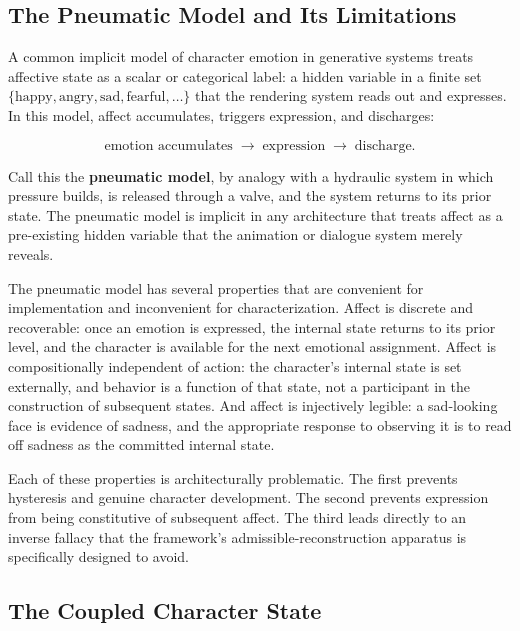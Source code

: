 \documentclass[11pt,a4paper]{article}
\theoremstyle{plain}
\theoremstyle{definition}
\theoremstyle{remark}
\begin{document}
\subsection{The Pneumatic Model and Its Limitations}

A common implicit model of character emotion in generative systems treats affective state as a scalar or categorical label: a hidden variable in a finite set $\{\text{happy}, \text{angry}, \text{sad}, \text{fearful}, \ldots\}$ that the rendering system reads out and expresses. In this model, affect accumulates, triggers expression, and discharges:

\[
\text{emotion accumulates} \;\to\; \text{expression} \;\to\; \text{discharge}.
\]

Call this the \textbf{pneumatic model}, by analogy with a hydraulic system in which pressure builds, is released through a valve, and the system returns to its prior state. The pneumatic model is implicit in any architecture that treats affect as a pre-existing hidden variable that the animation or dialogue system merely reveals.

The pneumatic model has several properties that are convenient for implementation and inconvenient for characterization. Affect is discrete and recoverable: once an emotion is expressed, the internal state returns to its prior level, and the character is available for the next emotional assignment. Affect is compositionally independent of action: the character's internal state is set externally, and behavior is a function of that state, not a participant in the construction of subsequent states. And affect is injectively legible: a sad-looking face is evidence of sadness, and the appropriate response to observing it is to read off sadness as the committed internal state.

Each of these properties is architecturally problematic. The first prevents hysteresis and genuine character development. The second prevents expression from being constitutive of subsequent affect. The third leads directly to an inverse fallacy that the framework's admissible-reconstruction apparatus is specifically designed to avoid.

\subsection{The Coupled Character State}
\end{document}
